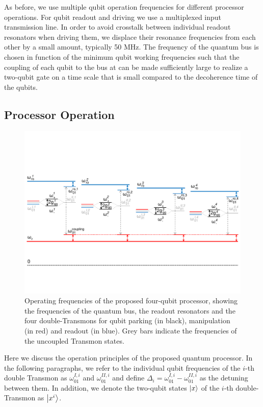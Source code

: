 \smallskip

As before, we use multiple qubit operation frequencies for different processor operations. For qubit readout and driving we use a multiplexed input transmission line. In order to avoid crosstalk between individual readout resonators when driving them, we displace their resonance frequencies from each other by a small amount, typically 50 MHz. The frequency of the quantum bus is chosen in function of the minimum qubit working frequencies such that the coupling of each qubit to the bus at can be made sufficiently large to realize a two-qubit gate on a time scale that is small compared to the decoherence time of the qubits. 

\subsection{Processor Operation}

\begin{figure}[ht!]
	\centering
	\includegraphics[width=\textwidth]{./material/figures/scalable-architecture/qubit_architecture_energy_levels}
	\caption[]{Operating frequencies of the proposed four-qubit processor, showing the frequencies of the quantum bus, the readout resonators and the four double-Transmons for qubit parking (in black), manipulation (in red) and readout (in blue). Grey bars indicate the frequencies of the uncoupled Transmon states.}
	\label{fig:scalable_architecture_energy_levels}
\end{figure}

Here we discuss the operation principles of the proposed quantum processor. In the following paragraphs, we refer to the individual qubit frequencies of the $i$-th double Transmon as $\omega_{01}^{I,i}$ and $\omega_{01}^{II,i}$ and define $\Delta_i = \omega_{01}^{I,i}-\omega_{01}^{II,i}$ as the detuning between them. In addition, we denote the two-qubit states $\left| x \right>$ of the $i$-th double-Transmon as $\left| x^i \right>$. 

